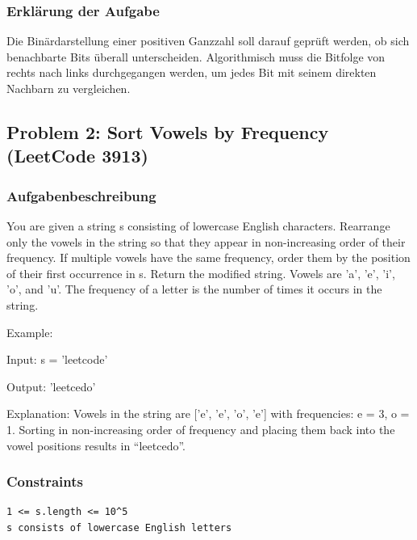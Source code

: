 \subsubsection*{Erklärung der Aufgabe}
Die Binärdarstellung einer positiven Ganzzahl soll darauf geprüft werden, 
ob sich benachbarte Bits überall unterscheiden. Algorithmisch muss die Bitfolge von rechts nach links durchgegangen werden, um jedes Bit 
mit seinem direkten Nachbarn zu vergleichen.

\clearpage

\subsection{Problem 2: Sort Vowels by Frequency (LeetCode 3913)}

\subsubsection*{Aufgabenbeschreibung}
You are given a string s consisting of lowercase English characters.
Rearrange only the vowels in the string so that they appear in non-increasing order of their frequency.
If multiple vowels have the same frequency, order them by the position of their first occurrence in s.
Return the modified string.
Vowels are 'a', 'e', 'i', 'o', and 'u'.
The frequency of a letter is the number of times it occurs in the string.

Example:

Input: s = 'leetcode'

Output: 'leetcedo'

Explanation: Vowels in the string are ['e', 'e', 'o', 'e'] with frequencies: e = 3, o = 1. Sorting in non-increasing order of frequency and placing them back 
into the vowel positions results in \enquote{leetcedo}.

\subsubsection*{Constraints}
\begin{lstlisting}[style=appendixdata]
1 <= s.length <= 10^5
s consists of lowercase English letters
\end{lstlisting}

